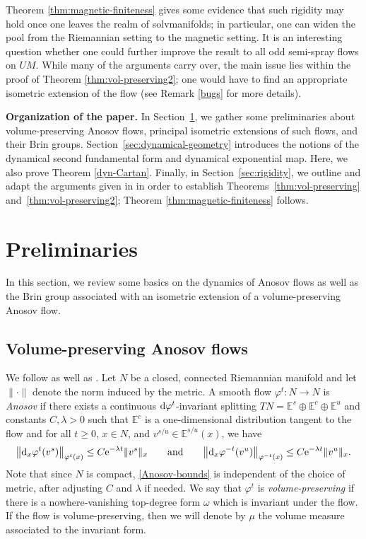 \documentclass[10pt,a4paper]{amsart}
\newcommand{\E}{\mathbb{E}}
\numberwithin{equation}{section}
\theoremstyle{definition}
\begin{document}
Theorem \ref{thm:magnetic-finiteness} gives some evidence that such rigidity may hold once one leaves the realm of solvmanifolds; in particular, one can widen the pool from the Riemannian setting to the magnetic setting. It is an interesting question whether one could further improve the result to all odd semi-spray flows on $UM$. While many of the arguments carry over, the main issue lies within the proof of Theorem \ref{thm:vol-preserving2}; one would have to find an appropriate isometric extension of the flow (see Remark \ref{bugs} for more details).

{\bf Organization of the paper.} In Section~\ref{sec:preliminaries}, we gather some preliminaries about volume-preserving Anosov flows, principal isometric extensions of such flows, and their Brin groups. Section~\ref{sec:dynamical-geometry} introduces the notions of the dynamical second fundamental form and dynamical exponential map. Here, we also prove Theorem \ref{dyn-Cartan}. Finally, in Section~\ref{sec:rigidity}, we outline and adapt the arguments given in \cite{filip2024finiteness} in order to establish Theorems~\ref{thm:vol-preserving} and~\ref{thm:vol-preserving2}; Theorem \ref{thm:magnetic-finiteness} follows.



\section{Preliminaries}\label{sec:preliminaries}

In this section, we review some basics on the dynamics of Anosov flows as well as the Brin group associated with an isometric extension of a volume-preserving Anosov flow.

\subsection{Volume-preserving Anosov flows} \label{subsec:anosov-flows}

We follow \cite[Section 2.1]{filip2024finiteness} as well as \cite{fisher}. Let $N$ be a closed, connected Riemannian manifold and let $\|\cdot\|$ denote the norm induced by the metric. A smooth flow $\varphi^t \colon N \rightarrow N$ is \emph{Anosov} if there exists a continuous \mbox{${\rm d}\varphi^t$-in\-va\-ri\-ant} splitting $TN = \E^s \oplus \E^c \oplus \E^u$ and constants $C, \lambda > 0$ such that $\E^c$ is a one-dimensional distribution tangent to the flow and for all $t \geq 0$, $x \in N$, and $v^{s/u} \in \E^{s/u}(x)$, we have
\begin{equation}\label{Anosov-bounds} \bigl\|{\rm d}_x \varphi^t(v^s)\bigr\|_{\varphi^t(x)} \leq C {\rm e}^{-\lambda t} \|v^s\|_x \qquad \text{and}\qquad \bigl\|{\rm d}_x\varphi^{-t}(v^u)\bigr\|_{\varphi^{-t}(x)} \leq C {\rm e}^{-\lambda t} \|v^u\|_x. \end{equation}
Note that since $N$ is compact,
\eqref{Anosov-bounds}
is independent of the choice of metric, after adjusting $C$ and $\lambda$ if needed.
We say that $\varphi^t$ is \emph{volume-preserving} if there is a nowhere-vanishing top-degree form $\omega$ which is invariant under the flow. If the flow is volume-preserving, then we will denote by $\mu$ the volume measure associated to the invariant form.
\end{document}
